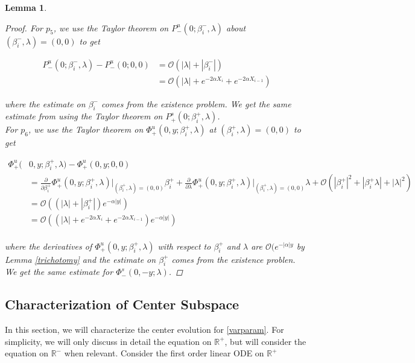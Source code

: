 \documentclass[12pt]{article}
\def\R{{\mathbb R}}
\newtheorem{lemma}{Lemma}
\begin{document}
\begin{lemma}
\begin{proof}
For $p_5$, we use the Taylor theorem on $P^u_-(0; \beta_i^-, \lambda)$ about $(\beta_i^-, \lambda) = (0, 0)$ to get 

\begin{align*}
P^u_-(0; \beta_i^-, \lambda) - P^u_-(0; 0, 0) &= \mathcal{O}(|\lambda| + |\beta_i^-|) \\
&= \mathcal{O}(|\lambda| + e^{-2 \alpha X_i} + e^{-2 \alpha X_{i-1}})
\end{align*}

where the estimate on $\beta_i^-$ comes from the existence problem. We get the same estimate from using the Taylor theorem on $P^s_+(0; \beta_i^+, \lambda)$.\\

For $p_6$, we use the Taylor theorem on $\Phi^u_+(0, y; \beta_i^+, \lambda)$ at $(\beta_i^+, \lambda) = (0, 0)$ to get 

\begin{align*}
\Phi^u_+(&0, y; \beta_i^+, \lambda) - \Phi^u_+(0, y; 0, 0) \\
&= \frac{\partial}{\partial \beta_i^+}\Phi^u_+(0, y; \beta_i^+, \lambda)\Big|_{(\beta_i^+, \lambda) = (0, 0)} \beta_i^+ + \frac{\partial}{\partial \lambda}\Phi^u_+(0, y; \beta_i^+, \lambda)\Big|_{(\beta_i^+, \lambda) = (0, 0)} \lambda + \mathcal{O}(|\beta_i^+|^2 + |\beta_i^+ \lambda| + |\lambda|^2) \\
&= \mathcal{O}((|\lambda| + |\beta_i^+|)e^{-\alpha |y| }) \\
&= \mathcal{O}((|\lambda| + e^{-2 \alpha X_i} + e^{-2 \alpha X_{i-1}})e^{-\alpha |y| }) \\
\end{align*}

where the derivatives of $\Phi^u_+(0, y; \beta_i^+, \lambda)$ with respect to $\beta_i^+$ and $\lambda$ are $\mathcal{O}(e^{-|\alpha|y}$ by Lemma \ref{trichotomy} and the estimate on $\beta_i^+$ comes from the existence problen. We get the same estimate for $\Phi^s_-(0, -y; \lambda)$.

\end{proof}
\end{lemma}


\subsection{Characterization of Center Subspace}

In this section, we will characterize the center evolution for \eqref{varparam}. For simplicity, we will only discuss in detail the equation on $\R^+$, but will consider the equation on $\R^-$ when relevant. Consider the first order linear ODE on $\R^+$
\end{document}
